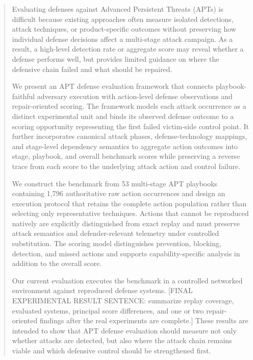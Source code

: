 \begin{abstract}
Evaluating defenses against Advanced Persistent Threats (APTs) is difficult because existing approaches often measure isolated detections, attack techniques, or product-specific outcomes without preserving how individual defense decisions affect a multi-stage attack campaign. As a result, a high-level detection rate or aggregate score may reveal whether a defense performs well, but provides limited guidance on where the defensive chain failed and what should be repaired.

We present an APT defense evaluation framework that connects playbook-faithful adversary execution with action-level defense observations and repair-oriented scoring. The framework models each attack occurrence as a distinct experimental unit and binds its observed defense outcome to a scoring opportunity representing the first failed victim-side control point. It further incorporates canonical attack phases, defense-technology mappings, and stage-level dependency semantics to aggregate action outcomes into stage, playbook, and overall benchmark scores while preserving a reverse trace from each score to the underlying attack action and control failure.

We construct the benchmark from 53 multi-stage APT playbooks containing 1,796 authoritative raw action occurrences and design an execution protocol that retains the complete action population rather than selecting only representative techniques. Actions that cannot be reproduced natively are explicitly distinguished from exact replay and must preserve attack semantics and defender-relevant telemetry under controlled substitution. The scoring model distinguishes prevention, blocking, detection, and missed actions and supports capability-specific analysis in addition to the overall score.

Our current evaluation executes the benchmark in a controlled networked environment against reproduced defense systems. [FINAL EXPERIMENTAL RESULT SENTENCE: summarize replay coverage, evaluated systems, principal score differences, and one or two repair-oriented findings after the real experiments are complete.] These results are intended to show that APT defense evaluation should measure not only whether attacks are detected, but also where the attack chain remains viable and which defensive control should be strengthened first.
\end{abstract}